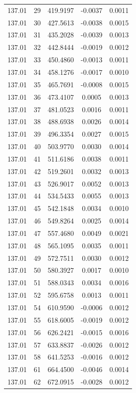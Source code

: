 {\begin{longtable}{lcccc}
137.01 & 29 & 419.9197 & -0.0037 &  0.0011 \\
137.01 & 30 & 427.5613 & -0.0038 &  0.0015 \\
137.01 & 31 & 435.2028 & -0.0039 &  0.0013 \\
137.01 & 32 & 442.8444 & -0.0019 &  0.0012 \\
137.01 & 33 & 450.4860 & -0.0013 &  0.0011 \\
137.01 & 34 & 458.1276 & -0.0017 &  0.0010 \\
137.01 & 35 & 465.7691 & -0.0008 &  0.0015 \\
137.01 & 36 & 473.4107 &  0.0005 &  0.0013 \\
137.01 & 37 & 481.0523 &  0.0016 &  0.0011 \\
137.01 & 38 & 488.6938 &  0.0026 &  0.0014 \\
137.01 & 39 & 496.3354 &  0.0027 &  0.0015 \\
137.01 & 40 & 503.9770 &  0.0030 &  0.0014 \\
137.01 & 41 & 511.6186 &  0.0038 &  0.0011 \\
137.01 & 42 & 519.2601 &  0.0032 &  0.0013 \\
137.01 & 43 & 526.9017 &  0.0052 &  0.0013 \\
137.01 & 44 & 534.5433 &  0.0055 &  0.0013 \\
137.01 & 45 & 542.1848 &  0.0034 &  0.0010 \\
137.01 & 46 & 549.8264 &  0.0025 &  0.0014 \\
137.01 & 47 & 557.4680 &  0.0049 &  0.0021 \\
137.01 & 48 & 565.1095 &  0.0035 &  0.0011 \\
137.01 & 49 & 572.7511 &  0.0030 &  0.0012 \\
137.01 & 50 & 580.3927 &  0.0017 &  0.0010 \\
137.01 & 51 & 588.0343 &  0.0034 &  0.0016 \\
137.01 & 52 & 595.6758 &  0.0013 &  0.0011 \\
137.01 & 54 & 610.9590 & -0.0006 &  0.0012 \\
137.01 & 55 & 618.6005 & -0.0019 &  0.0012 \\
137.01 & 56 & 626.2421 & -0.0015 &  0.0016 \\
137.01 & 57 & 633.8837 & -0.0026 &  0.0012 \\
137.01 & 58 & 641.5253 & -0.0016 &  0.0012 \\
137.01 & 61 & 664.4500 & -0.0046 &  0.0014 \\
137.01 & 62 & 672.0915 & -0.0028 &  0.0012 \\

\end{longtable}}
